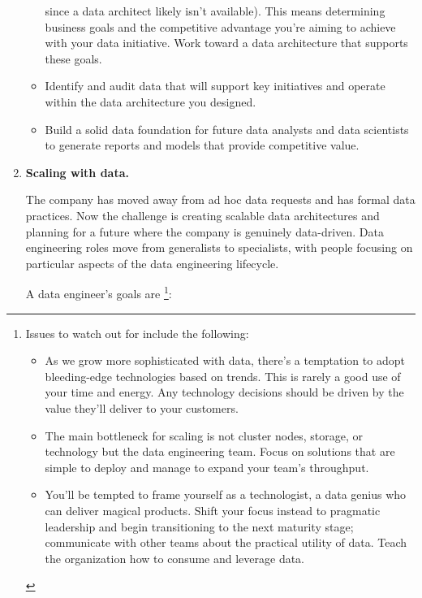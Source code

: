 \begin{enumerate}
\begin{itemize}
        since a data architect likely isn't available). This means
        determining business goals and the competitive advantage
        you're aiming to achieve with your data initiative. Work
        toward a data architecture that supports these goals.
        \item Identify and audit data that will support key
        initiatives and operate within the data architecture you
        designed.
        \item Build a solid data foundation for future data analysts
        and data scientists to generate reports and models that
        provide competitive value.
    \end{itemize}

    
    \item \textbf{Scaling with data.}
    
    \noindent
    The company has moved away from ad hoc data requests
    and has formal data practices. Now the challenge is creating
    scalable data architectures and planning for a future where the
    company is genuinely data-driven. Data engineering roles move from
    generalists to specialists, with people focusing on particular
    aspects of the data engineering lifecycle.

    A data engineer's goals are
    \footnote{
        Issues to watch out for include the following:
        \begin{itemize}
            \item As we grow more sophisticated with data, there's a
            temptation to adopt bleeding-edge technologies based on
            trends. This is rarely a good use of your time and energy.
            Any technology decisions should be driven by the value
            they'll deliver to your customers.
            \item The main bottleneck for scaling is not cluster nodes,
            storage, or technology but the data engineering team.
            Focus on solutions that are simple to deploy and
            manage to expand your team's throughput.
            \item You'll be tempted to frame yourself as a technologist,
            a data genius who can deliver magical products. Shift your
            focus instead to pragmatic leadership and begin transitioning
            to the next maturity stage; communicate with other teams
            about the practical utility of data. Teach the organization
            how to consume and leverage data.
        \end{itemize}
    }:
    

\end{enumerate}
